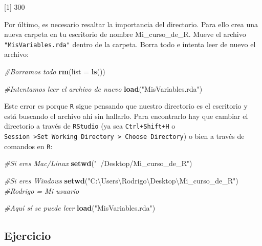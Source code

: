 \documentclass[
]{book}
\newenvironment{Shaded}{\begin{snugshade}}{\end{snugshade}}
\newcommand{\CommentTok}[1]{\textcolor[rgb]{0.56,0.35,0.01}{\textit{#1}}}
\newcommand{\DataTypeTok}[1]{\textcolor[rgb]{0.13,0.29,0.53}{#1}}
\newcommand{\KeywordTok}[1]{\textcolor[rgb]{0.13,0.29,0.53}{\textbf{#1}}}
\newcommand{\NormalTok}[1]{#1}
\newcommand{\StringTok}[1]{\textcolor[rgb]{0.31,0.60,0.02}{#1}}
\begin{document}
{[}1{]} 300

Por último, es necesario resaltar la importancia del directorio. Para ello crea una nueva carpeta en tu escritorio de nombre Mi\_curso\_de\_R. Mueve el archivo \texttt{"MisVariables.rda"} dentro de la carpeta. Borra todo e intenta leer de nuevo el archivo:

\begin{Shaded}
\begin{Highlighting}[]
\CommentTok{#Borramos todo}
\KeywordTok{rm}\NormalTok{(}\DataTypeTok{list =} \KeywordTok{ls}\NormalTok{())}

\CommentTok{#Intentamos leer el archivo de nuevo}
\KeywordTok{load}\NormalTok{(}\StringTok{"MisVariables.rda"}\NormalTok{)}
\end{Highlighting}
\end{Shaded}

Este error es porque \texttt{R} sigue pensando que nuestro directorio es el escritorio y está buscando el archivo ahí sin hallarlo. Para encontrarlo hay que cambiar el directorio a través de \texttt{RStudio} (ya sea \texttt{Ctrl+Shift+H} o \texttt{Session\ \textgreater{}Set\ Working\ Directory\ \textgreater{}\ Choose\ Directory}) o bien a través de comandos en \texttt{R}:

\begin{Shaded}
\begin{Highlighting}[]
\CommentTok{#Si eres Mac/Linux}
\KeywordTok{setwd}\NormalTok{(}\StringTok{"~/Desktop/Mi_curso_de_R"}\NormalTok{) }

\CommentTok{#Si eres Windows}
\KeywordTok{setwd}\NormalTok{(}\StringTok{"C:\textbackslash{}Users\textbackslash{}Rodrigo\textbackslash{}Desktop\textbackslash{}Mi_curso_de_R"}\NormalTok{) }\CommentTok{#Rodrigo = Mi usuario}
\end{Highlighting}
\end{Shaded}

\begin{Shaded}
\begin{Highlighting}[]
\CommentTok{#Aquí sí se puede leer}
\KeywordTok{load}\NormalTok{(}\StringTok{"MisVariables.rda"}\NormalTok{)}
\end{Highlighting}
\end{Shaded}

\hypertarget{ejercicio-2}{%
\subsection{Ejercicio}\label{ejercicio-2}}
\end{document}
